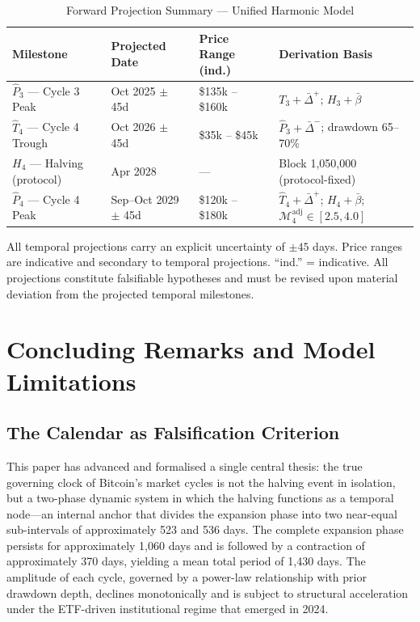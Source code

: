 \begin{table}[H]
  \centering
  \caption{Forward Projection Summary --- Unified Harmonic Model}
  \label{tab:projections}
  \renewcommand{\arraystretch}{1.45}
  \begin{tabularx}{\textwidth}{l l l X}
    \toprule
    \textbf{Milestone} &
    \textbf{Projected Date} &
    \textbf{Price Range (ind.)} &
    \textbf{Derivation Basis} \\
    \midrule
    $\hat{P}_3$ --- Cycle 3 Peak
      & Oct 2025 $\pm$ 45d
      & \$135k -- \$160k
      & $T_3 + \bar{\Delta}^{+}$; $H_3 + \bar{\beta}$ \\[4pt]
    $\hat{T}_4$ --- Cycle 4 Trough
      & Oct 2026 $\pm$ 45d
      & \$35k -- \$45k
      & $\hat{P}_3 + \bar{\Delta}^{-}$; drawdown 65--70\% \\[4pt]
    $H_4$ --- Halving (protocol)
      & Apr 2028
      & ---
      & Block 1,050,000 (protocol-fixed) \\[4pt]
    $\hat{P}_4$ --- Cycle 4 Peak
      & Sep--Oct 2029 $\pm$ 45d
      & \$120k -- \$180k
      & $\hat{T}_4 + \bar{\Delta}^{+}$; $H_4 + \bar{\beta}$;
        $\mathcal{M}_4^{\text{adj}} \in [2.5, 4.0]$ \\
    \bottomrule
  \end{tabularx}
  \medskip
  \begin{minipage}{\textwidth}
    \small
    All temporal projections carry an explicit uncertainty of $\pm 45$ days.
    Price ranges are indicative and secondary to temporal projections.
    ``ind.'' = indicative. All projections constitute falsifiable hypotheses
    and must be revised upon material deviation from the projected temporal
    milestones.
  \end{minipage}
\end{table}


\section{Concluding Remarks and Model Limitations}

\subsection{The Calendar as Falsification Criterion}

This paper has advanced and formalised a single central thesis: the true
governing clock of Bitcoin's market cycles is not the halving event in
isolation, but a two-phase dynamic system in which the halving functions as a
temporal node---an internal anchor that divides the expansion phase into two
near-equal sub-intervals of approximately 523 and 536 days. The complete
expansion phase persists for approximately 1,060 days and is followed by a
contraction of approximately 370 days, yielding a mean total period of
1,430 days. The amplitude of each cycle, governed by a power-law relationship
with prior drawdown depth, declines monotonically and is subject to structural
acceleration under the ETF-driven institutional regime that emerged in 2024.

